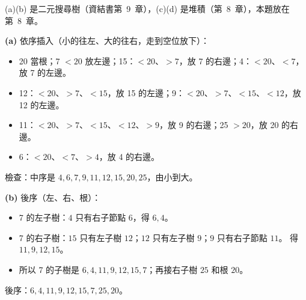 \begin{pastsoln}
(a)(b) 是二元搜尋樹（資結書第~9~章），(c)(d) 是堆積（第~8~章），本題放在第~8~章。

\textbf{(a)} 依序插入（小的往左、大的往右，走到空位放下）：
\begin{itemize}
\item 20 當根；7 $< 20$ 放左邊；15：$< 20$、$> 7$，放 7 的右邊；4：$< 20$、$< 7$，放 7 的左邊。
\item 12：$< 20$、$> 7$、$< 15$，放 15 的左邊；9：$< 20$、$> 7$、$< 15$、$< 12$，放 12 的左邊。
\item 11：$< 20$、$> 7$、$< 15$、$< 12$、$> 9$，放 9 的右邊；25 $> 20$，放 20 的右邊。
\item 6：$< 20$、$< 7$、$> 4$，放 4 的右邊。
\end{itemize}
\begin{center}
\end{center}
檢查：中序是 $4, 6, 7, 9, 11, 12, 15, 20, 25$，由小到大。

\textbf{(b)} 後序（左、右、根）：
\begin{itemize}
\item 7 的左子樹：$4$ 只有右子節點 $6$，得 $6, 4$。
\item 7 的右子樹：$15$ 只有左子樹 $12$；$12$ 只有左子樹 $9$；$9$ 只有右子節點 $11$。 得 $11, 9, 12, 15$。
\item 所以 7 的子樹是 $6, 4, 11, 9, 12, 15, 7$；再接右子樹 $25$ 和根 $20$。
\end{itemize}
後序：$6, 4, 11, 9, 12, 15, 7, 25, 20$。


\end{pastsoln}
